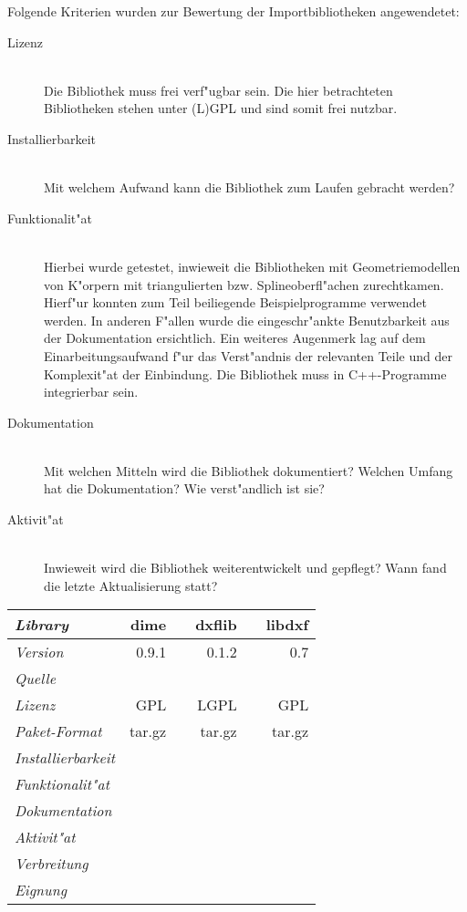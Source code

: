 Folgende Kriterien wurden zur Bewertung der Importbibliotheken angewendetet:
\begin{description}
\item[Lizenz] ~\\ 
    Die Bibliothek muss frei verf"ugbar sein. Die hier betrachteten 
    Bibliotheken stehen unter (L)GPL und sind somit frei nutzbar.
\item[Installierbarkeit] ~\\ 
    Mit welchem Aufwand kann die Bibliothek zum Laufen gebracht werden?
\item[Funktionalit"at] ~\\ 
    Hierbei wurde getestet, inwieweit die Bibliotheken
    mit Geometriemodellen von K"orpern mit triangulierten bzw. 
    Splineoberfl"achen zurechtkamen. Hierf"ur konnten zum Teil beiliegende 
    Beispielprogramme verwendet werden. In anderen F"allen wurde die 
    eingeschr"ankte Benutzbarkeit aus der Dokumentation ersichtlich.
    Ein weiteres Augenmerk lag auf dem Einarbeitungsaufwand f"ur das
    Verst"andnis der relevanten Teile und der Komplexit"at der Einbindung.
    Die Bibliothek muss in C++-Programme integrierbar sein.
\item[Dokumentation] ~\\ 
    Mit welchen Mitteln wird die Bibliothek dokumentiert?
    Welchen Umfang hat die Dokumentation? Wie verst"andlich ist sie?
\item[Aktivit"at] ~\\ 
    Inwieweit wird die Bibliothek weiterentwickelt und gepflegt? 
    Wann fand die letzte Aktualisierung statt?
\end{description}

\tabbeg{}
\newcommand\headline[4]
    {\textbf{\emph{#1}} & \textbf{#2} & & \textbf{#3} & & \textbf{#4} \\}
\newcommand{\feature}[4]{\emph{#1} & #2 & & #3 & & #4 \\ \hline }
\begin{tabular}{|l|rcrcr|}
\hline
\headline{Library}{dime}{dxflib}{libdxf}
\hline
\feature{Version}{0.9.1}{0.1.2}{0.7}
\feature{Quelle}{\cite{dime}}{\cite{dxflib}}{\cite{libdxf}}
\feature{Lizenz}{GPL}{LGPL}{GPL}
\feature{Paket-Format}{tar.gz}{tar.gz}{tar.gz}
\feature{Installierbarkeit}{\neutral}{\neutral}{\neutral}
\feature{Funktionalit"at}{\positive}{\negative}{\neutral}
\feature{Dokumentation}{\neutral}{\negative}{\negative}
\feature{Aktivit"at}{\positive}{\positive}{\negative}
\feature{Verbreitung}{\positive}{\neutral}{\negative}
\feature{Eignung}{\positive}{\negative}{\negative}
\end{tabular}

